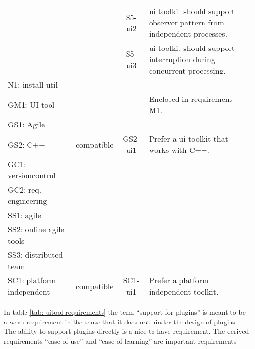 \begin{center}
\begin{supertabular}{ll||cp{13em}}
	                          &              & S5-ui2   & ui toolkit should support observer pattern from independent processes.\\
	                          &              & S5-ui3   & ui toolkit should support interruption during concurrent processing.\\
        N1: install util          &              &          & \\
        \hline
        GM1: UI tool	          &              &          & Enclosed in requirement M1.\\
        GS1: Agile	          &              &          & \\
        GS2: C++	          & compatible   & GS2-ui1  & Prefer a ui toolkit that works with C++.\\
        GC1: versioncontrol       &              &          & \\
        GC2: req. engineering     &              &          & \\
        \hline
        SS1: agile	          &              &          & \\
        SS2: online agile tools   &              &          & \\
        SS3: distributed team     &              &          & \\
        SC1: platform independent & compatible	 & SC1-ui1  & Prefer a platform independent toolkit.\\
        \hline
    \end{supertabular}
    \label{tab: uitool-requirements}
\end{center}

In table \ref{tab: uitool-requirements} the term ``support for plugins''
is meant to be a weak requirement in the sense that it does not hinder
the design of plugins. The ability to support plugins directly is a nice
to have requirement. The derived requirements ``ease of use'' and ``ease of
learning'' are important requirements






